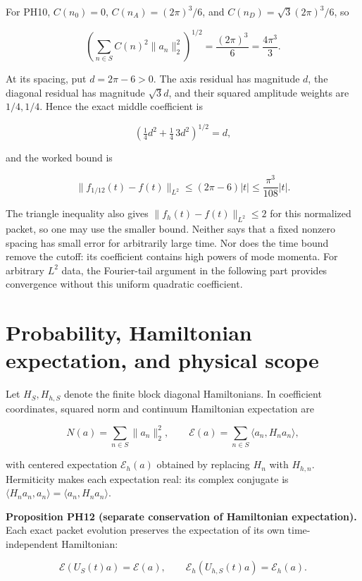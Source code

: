 For PH10, \(C(n_0)=0\), \(C(n_A)=(2\pi)^3/6\), and
\(C(n_D)=\sqrt3(2\pi)^3/6\), so

\[
\left(\sum_{n\in S}C(n)^2\|a_n\|_2^2\right)^{1/2}
=\frac{(2\pi)^3}{6}=\frac{4\pi^3}{3}.
\]

At its spacing, put \(d=2\pi-6>0\). The axis residual has magnitude
\(d\), the diagonal residual has magnitude \(\sqrt3d\), and their
squared amplitude weights are \(1/4,1/4\). Hence the exact middle
coefficient is

\[
\left(\tfrac14d^2+\tfrac14\,3d^2\right)^{1/2}=d,
\]

and the worked bound is

\[
\|f_{1/12}(t)-f(t)\|_{L^2}
\le(2\pi-6)|t|\le\frac{\pi^3}{108}|t|.
\]

The triangle inequality also gives \(\|f_h(t)-f(t)\|_{L^2}\le2\) for
this normalized packet, so one may use the smaller bound. Neither says
that a fixed nonzero spacing has small error for arbitrarily large time.
Nor does the time bound remove the cutoff: its coefficient contains high
powers of mode momenta. For arbitrary \(L^2\) data, the Fourier-tail argument in the following part
provides convergence without this uniform quadratic coefficient.

\hypertarget{probability-hamiltonian-expectation-and-physical-scope}{%
\section{Probability, Hamiltonian expectation, and physical
scope}\label{probability-hamiltonian-expectation-and-physical-scope}}

Let \(H_S,H_{h,S}\) denote the finite block diagonal Hamiltonians. In
coefficient coordinates, squared norm and continuum Hamiltonian
expectation are

\[
N(a)=\sum_{n\in S}\|a_n\|_2^2,\qquad
\mathcal E(a)=\sum_{n\in S}\langle a_n,H_na_n\rangle,
\]

with centered expectation \(\mathcal E_h(a)\) obtained by replacing
\(H_n\) with \(H_{h,n}\). Hermiticity makes each expectation real: its
complex conjugate is
\(\langle H_na_n,a_n\rangle=\langle a_n,H_na_n\rangle\).

\textbf{Proposition PH12 (separate conservation of Hamiltonian
expectation).} Each exact packet evolution preserves the expectation of
its own time-independent Hamiltonian:

\[
\mathcal E(U_S(t)a)=\mathcal E(a),\qquad
\mathcal E_h(U_{h,S}(t)a)=\mathcal E_h(a).
\]

